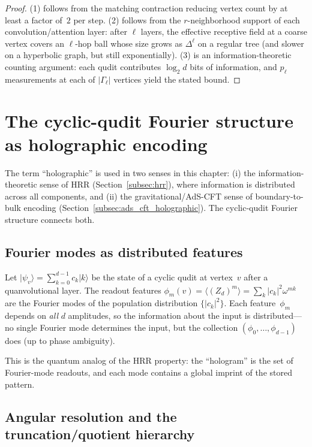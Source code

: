 \documentclass[11pt,oneside]{amsbook}
\numberwithin{equation}{section}
\theoremstyle{plain}
\theoremstyle{definition}
\theoremstyle{remark}
\newcommand{\ket}[1]{\lvert #1 \rangle}
\begin{document}
\begin{proof}
(1) follows from the matching contraction reducing vertex count by at least a factor of~$2$ per step.
(2) follows from the $r$-neighborhood support of each convolution/attention layer: after $\ell$
layers, the effective receptive field at a coarse vertex covers an $\ell$-hop ball whose size
grows as $\Delta^\ell$ on a regular tree (and slower on a hyperbolic graph, but still exponentially).
(3) is an information-theoretic counting argument: each qudit contributes $\log_2 d$ bits of
information, and $p_\ell$ measurements at each of $|\Gamma_\ell|$ vertices yield the stated bound.
\end{proof}


\section{The cyclic-qudit Fourier structure as holographic encoding}
\label{sec:cyclic_holographic_encoding}

The term ``holographic'' is used in two senses in this chapter:
(i) the information-theoretic sense of HRR (Section~\ref{subsec:hrr}), where information is
distributed across all components, and
(ii) the gravitational/AdS-CFT sense of boundary-to-bulk encoding (Section~\ref{subsec:ads_cft_holographic}).
The cyclic-qudit Fourier structure connects both.

\subsection{Fourier modes as distributed features}

Let $\ket{\psi_v}=\sum_{k=0}^{d-1}c_k\ket{k}$ be the state of a cyclic qudit at vertex~$v$
after a quanvolutional layer.
The readout features $\phi_m(v)=\langle(Z_d)^m\rangle=\sum_k |c_k|^2\omega^{mk}$ are the
Fourier modes of the population distribution $\{|c_k|^2\}$.
Each feature~$\phi_m$ depends on \emph{all} $d$ amplitudes, so the information about the
input is distributed---no single Fourier mode determines the input, but the collection
$(\phi_0,\ldots,\phi_{d-1})$ does (up to phase ambiguity).

This is the quantum analog of the HRR property: the ``hologram'' is the set of Fourier-mode
readouts, and each mode contains a global imprint of the stored pattern.

\subsection{Angular resolution and the truncation/quotient hierarchy}
\end{document}
